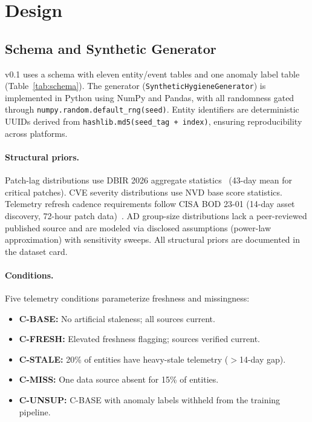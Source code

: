 
\section{\hygienebench Design}
\label{sec:design}

\subsection{Schema and Synthetic Generator}

\hygienebench v0.1 uses a schema with eleven entity/event tables and one anomaly
label table (Table~\ref{tab:schema}). The generator
(\texttt{Synthetic\allowbreak Hygiene\allowbreak Generator}) is implemented in
Python using NumPy and Pandas, with all randomness gated through
\texttt{numpy.\allowbreak random.\allowbreak default\_rng(seed)}. Entity identifiers are
deterministic UUIDs derived from
\texttt{hashlib.md5(\allowbreak seed\_tag + index)}, ensuring reproducibility
across platforms.



\paragraph{Structural priors.}
Patch-lag distributions use DBIR 2026 aggregate
statistics~\cite{verizon_dbir_2026} (43-day mean for critical
patches). CVE severity distributions use NVD base score statistics. Telemetry
refresh cadence requirements follow CISA BOD 23-01 (14-day asset discovery, 72-hour
patch data)~\cite{cisa_bod2301_2022}. AD group-size distributions lack a
peer-reviewed published source and are modeled via disclosed assumptions (power-law
approximation) with sensitivity sweeps. All structural priors are documented in the
dataset card.

\paragraph{Conditions.}
Five telemetry conditions parameterize freshness and missingness:

\begin{itemize}[leftmargin=*]
  \item \textbf{C-BASE:} No artificial staleness; all sources current.
  \item \textbf{C-FRESH:} Elevated freshness flagging; sources verified current.
  \item \textbf{C-STALE:} 20\% of entities have heavy-stale telemetry ($>$14-day gap).
  \item \textbf{C-MISS:} One data source absent for 15\% of entities.
  \item \textbf{C-UNSUP:} C-BASE with anomaly labels withheld from the training pipeline.
\end{itemize}

